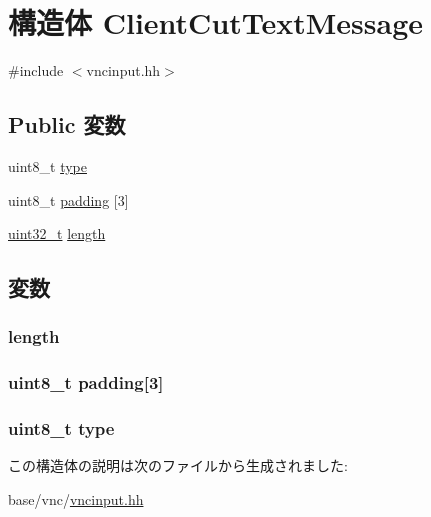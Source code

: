 \hypertarget{structVncInput_1_1ClientCutTextMessage}{
\section{構造体 ClientCutTextMessage}
\label{structVncInput_1_1ClientCutTextMessage}
}


{\ttfamily \#include $<$vncinput.hh$>$}\subsection*{Public 変数}
\begin{DoxyCompactItemize}
\item 
uint8\_\-t \hyperlink{structVncInput_1_1ClientCutTextMessage_a1d127017fb298b889f4ba24752d08b8e}{type}
\item 
uint8\_\-t \hyperlink{structVncInput_1_1ClientCutTextMessage_a735ef00341a84c02ba561c66de3d20af}{padding} \mbox{[}3\mbox{]}
\item 
\hyperlink{Type_8hh_a435d1572bf3f880d55459d9805097f62}{uint32\_\-t} \hyperlink{structVncInput_1_1ClientCutTextMessage_aebb70c2aab3407a9f05334c47131a43b}{length}
\end{DoxyCompactItemize}


\subsection{変数}
\hypertarget{structVncInput_1_1ClientCutTextMessage_aebb70c2aab3407a9f05334c47131a43b}{
\subsubsection[{length}]{ {\bf length}}}
\label{structVncInput_1_1ClientCutTextMessage_aebb70c2aab3407a9f05334c47131a43b}
\hypertarget{structVncInput_1_1ClientCutTextMessage_a735ef00341a84c02ba561c66de3d20af}{
\subsubsection[{padding}]{\setlength{\rightskip}{0pt plus 5cm}uint8\_\-t {\bf padding}\mbox{[}3\mbox{]}}}
\label{structVncInput_1_1ClientCutTextMessage_a735ef00341a84c02ba561c66de3d20af}
\hypertarget{structVncInput_1_1ClientCutTextMessage_a1d127017fb298b889f4ba24752d08b8e}{
\subsubsection[{type}]{\setlength{\rightskip}{0pt plus 5cm}uint8\_\-t {\bf type}}}
\label{structVncInput_1_1ClientCutTextMessage_a1d127017fb298b889f4ba24752d08b8e}


この構造体の説明は次のファイルから生成されました:\begin{DoxyCompactItemize}
\item 
base/vnc/\hyperlink{vncinput_8hh}{vncinput.hh}\end{DoxyCompactItemize}
